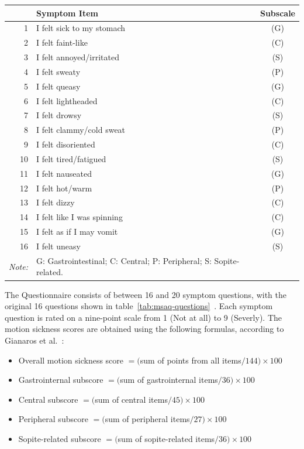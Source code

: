 \begin{center}
    \begin{tabular}{r l c}
        \toprule
        \textbf{} & \textbf{Symptom Item} & \textbf{Subscale} \\
        \midrule
         1 & I felt sick to my stomach  & (G) \\
         2 & I felt faint-like          & (C) \\
         3 & I felt annoyed/irritated   & (S) \\
         4 & I felt sweaty              & (P) \\
         5 & I felt queasy              & (G) \\
         6 & I felt lightheaded         & (C) \\
         7 & I felt drowsy              & (S) \\
         8 & I felt clammy/cold sweat   & (P) \\
         9 & I felt disoriented         & (C) \\
        10 & I felt tired/fatigued      & (S) \\
        11 & I felt nauseated           & (G) \\
        12 & I felt hot/warm            & (P) \\
        13 & I felt dizzy               & (C) \\
        14 & I felt like I was spinning & (C) \\
        15 & I felt as if I may vomit   & (G) \\
        16 & I felt uneasy              & (S) \\
        \bottomrule
        \textit{Note:} & G: Gastrointestinal; C: Central; P: Peripheral; S: Sopite-related. &
    \end{tabular}
    \label{tab:msaq-questions}
\end{center}
The Questionnaire consists of between 16 and 20 symptom questions, with the original 16 questions shown in
table~\ref{tab:msaq-questions}~\cite{Gianaros2001,Sevinc2020}.
Each symptom question is rated on a nine-point scale from 1 (Not at all) to 9 (Severly).
The motion sickness scores are obtained using the following formulas, according to Gianaros et al.~\cite{Gianaros2001}:
\begin{itemize}
    \item Overall motion sickness score $= ($sum of points from all items$ / 144) \times 100$
    \item Gastrointernal subscore $= ($sum of gastrointernal items$ / 36) \times 100$
    \item Central subscore $= ($sum of central items$ / 45) \times 100$
    \item Peripheral subscore $= ($sum of peripheral items$ / 27) \times 100$
    \item Sopite-related subscore $= ($sum of sopite-related items$ / 36) \times 100$
\end{itemize}

